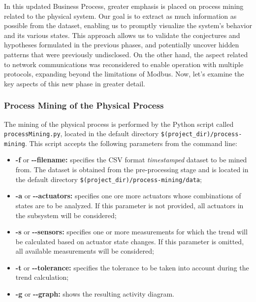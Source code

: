 \bigskip
In this updated Business Process, greater emphasis is placed on process mining related to the physical system. Our goal is to extract as much information as possible from the dataset, enabling us to promptly visualize the system's behavior and its various states. This approach allows us to validate the conjectures and hypotheses formulated in the previous phases, and potentially uncover hidden patterns that were previously undisclosed.\newline
On the other hand, the aspect related to network communications was reconsidered to enable operation with multiple protocols, expanding beyond the limitations of Modbus.\newline \newline %
Now, let's examine the key aspects of this new phase in greater detail.

\subsubsection{Process Mining of the Physical Process}
\label{subsub:4_proc_minining_phy}

The mining of the physical process is performed by the Python script called \texttt{processMining.py}, located in the default directory \texttt{\$(project\_dir)/process-mining}.\newline
This script accepts the following parameters from the command line:

\begin{itemize}
	\item \textbf{-f} or \textbf{{-}{-}filename:} specifies the CSV format \textit{timestamped} dataset to be mined from. The dataset is obtained from the pre-processing stage and is located in the default directory \texttt{\$(project\_dir)/process-mining/data};
	
	\item \textbf{-a} or \textbf{{-}{-}actuators:} specifies one ore more actuators whose combinations of states are to be analyzed. If this parameter is not provided, all actuators in the subsystem will be considered;
	
	\item \textbf{-s} or \textbf{{-}{-}sensors:} specifies one or more measurements for which the trend will be calculated based on actuator state changes. If this parameter is omitted, all available measurements will be considered;
	
	\item \textbf{-t} or \textbf{{-}{-}tolerance:} specifies the tolerance to be taken into account during the trend calculation; 
	
	\item \textbf{-g} or \textbf{{-}{-}graph:} shows the resulting activity diagram.
\end{itemize}

